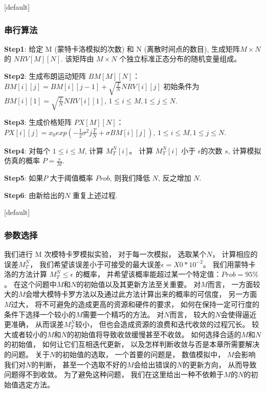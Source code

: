 \documentclass{beamer}
\makeatletter
\newenvironment{withoutheadline}{
  \setbeamertemplate{headline}[default]
  \def\beamer@entrycode{\vspace*{-\headheight}}
}{}
\makeatother
\begin{document}
\begin{withoutheadline}
\begin{frame}
\frametitle{串行算法}
\begin{algorithm}[H]
\textbf{Step1}: 给定 M (蒙特卡洛模拟的次数) 和 N (离散时间点的数目), 生成矩阵$M\times N$ 的
$NRV[M][N]$. 该矩阵由 $M\times N$ 个独立标准正态分布的随机变量组成。

\textbf{Step2}: 生成布朗运动矩阵 $BM[M][N]$：$BM[i][j]=BM[i][j-1]+\sqrt{\frac{T}{N}}NRV[i][j]$
初始条件为$BM[i][1]=\sqrt{\frac{T}{N}}NRV[i][1]$, $1\leq i\leq M, 1\leq j\leq N$.

\textbf{Step3}: 生成价格矩阵 $PX[M][N]$：$PX[i][j]=x_0exp(-\frac{1}{2}\sigma^2j\frac{T}{N}+\sigma BM[i][j])$,
$1\leq i\leq M, 1\leq j\leq N$.

\textbf{Step4}: 对每个 $1\leq i\leq M$, 计算 $M_T^N[i]$。 计算 $M_T^N[i]$ 小于 $\epsilon$的次数 $s$,
计算模拟仿真的概率 $P=\frac{s}{M}$.

\textbf{Step5}: 如果$P$ 大于阈值概率 $Prob$, 则我们降低 $N$, 反之增加 $N$.

\textbf{Step6}: 由新给出的$N$ 重复上述过程.
\end{algorithm}

\end{frame}
\end{withoutheadline}


\begin{withoutheadline}
\begin{frame}
	\frametitle{参数选择}
我们进行 M 次模特卡罗模拟实验， 对于每一次模拟， 选取某个$N$， 计算相应的误差$M_T^N$， 我们希望该误差小于可接受的最大误差$\epsilon=X0*10^{-2}$。
我们用蒙特卡洛的方法计算 $M_T^N\leq \epsilon$ 的概率， 并希望该概率能超过某一个特定值：$Prob=95\%$。
在这个问题中$M$和$N$的初始值以及其更新方法至关重要。 对$M$而言， 一方面较大的$M$会增大模特卡罗方法以及通过此方法计算出来的概率的可信度， 另一方面
$M$过大， 将不可避免的造成更高的资源和硬件的要求， 如何在保持一定可行度的条件下选择一个较小的$M$需要一个精巧的方法。
对$N$而言， 较大的$N$会使得逼近更准确， 从而误差$M_T^N$较小， 但也会造成资源的浪费和迭代收敛的过程冗长。
较大或者较小的$M$和$N$的初始值将导致收敛缓慢甚至不收敛。
如何选择合适的$M$和$N$的初始值，
如何让它们互相迭代更新， 以及怎样判断收敛与否是本章所需要解决的问题。
关于$N$的初始值的选取， 一个首要的问题是， 数值模拟中， $M$会影响我们对$N$的判断， 甚至一个选取不好的$M$会给出错误的$N$的更新方向，
从而导致问题得不到收敛。 为了避免这种问题， 我们在这里给出一种不依赖于$M$的$N$的初始值选定方法。
\end{frame}
\end{withoutheadline}
\end{document}

